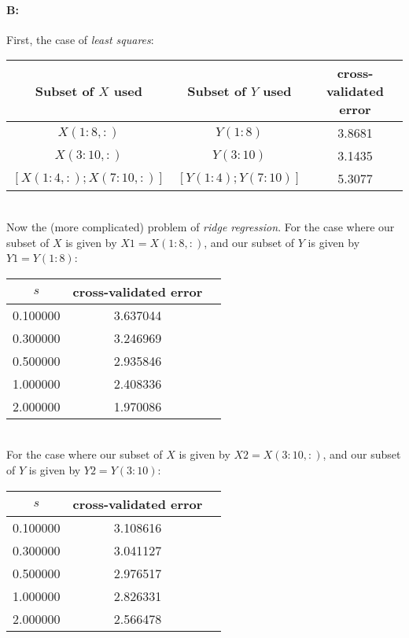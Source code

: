 \documentclass[11pt]{article}
\begin{document}
\paragraph{B:}

First, the case of \textit{least squares}: \\

\begin{tabular}{ | c | c | c | }
  \hline
   Subset of $X$ used & Subset of $Y$ used & cross-validated error \\
  \hline
  \hline
  $X(1:8, :)$ & $Y(1:8)$ & 3.8681 \\ 
  \hline
  $X(3:10,:)$ & $Y(3:10)$ & 3.1435 \\ 
  \hline
  $[X(1:4,:); X(7:10,:)]$ & $[Y(1:4); Y(7:10)]$ & 5.3077 \\ 
  \hline
\end{tabular} \\

Now the (more complicated) problem of \textit{ridge regression}. For the case where our subset of $X$ is given by $X1 = X(1:8, :)$, and our subset of $Y$ is given by $Y1 = Y(1:8)$: \\

\begin{tabular}{ | c | c | c | }
  \hline
  $s$ & cross-validated error \\
  \hline
  \hline
  0.100000 & 3.637044 \\ 
  \hline
  0.300000 & 3.246969 \\ 
  \hline
  0.500000 & 2.935846 \\ 
  \hline
  1.000000 & 2.408336 \\ 
  \hline
  2.000000 & 1.970086 \\ 
  \hline
\end{tabular} \\

For the case where our subset of $X$ is given by $X2 = X(3:10,:)$, and our subset of $Y$ is given by $Y2 = Y(3:10)$: \\

\begin{tabular}{ | c | c | c | }
  \hline
  $s$ & cross-validated error \\
  \hline
  \hline
  0.100000 & 3.108616 \\ 
  \hline
  0.300000 & 3.041127 \\ 
  \hline
  0.500000 & 2.976517 \\ 
  \hline
  1.000000 & 2.826331 \\ 
  \hline
  2.000000 & 2.566478 \\ 
  \hline
\end{tabular} \\
\end{document}
